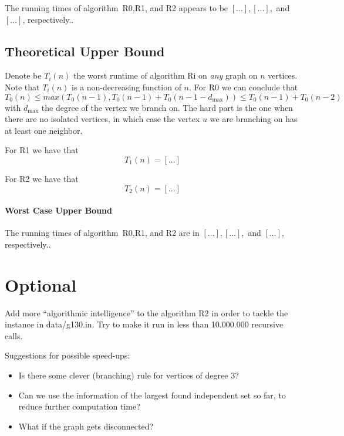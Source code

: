 \documentclass{tufte-handout}
\begin{document}
The running times of algorithm~R0,R1, and R2 appears to be $[\ldots],[\ldots],$ and $[\ldots]$, respectively..

\subsection{Theoretical Upper Bound}

Denote be $T_i(n)$ the worst runtime of algorithm Ri on \emph{any} graph on $n$ vertices.
Note that $T_i(n)$ is a non-decreasing function of $n$.
For R0 we can conclude that
\[
T_0(n)\leq max(T_0(n-1), T_0(n-1)+T_0(n-1-d_{\mbox{max}})) \leq T_0(n-1)+T_0(n-2)
\]
with $d_{\mbox{max}}$ the degree of the vertex we branch on. The hard part is the one when there are no isolated vertices, in which case the vertex $u$ we are branching on has at least one neighbor. 

For R1 we have that
 \[
 T_1(n)=[\ldots]
 \]

For R2 we have that
 \[
 T_2(n)=[\ldots]
 \]
\paragraph{Worst Case Upper Bound}
The running times of algorithm~R0,R1, and R2 are in $[\ldots],[\ldots],$ and $[\ldots]$, respectively..
\newpage

\section{Optional}
Add more ``algorithmic intelligence'' to the algorithm R2 in order to tackle the instance in data/g130.in.
Try to make it run in less than 10.000.000 recursive calls. 

Suggestions for possible speed-ups:
\begin{itemize}
\item Is there some clever (branching) rule for vertices of degree 3?
\item Can we use the information of the largest found independent set so far, to reduce further computation time?
\item What if the graph gets disconnected?
\end{itemize}
\end{document}
